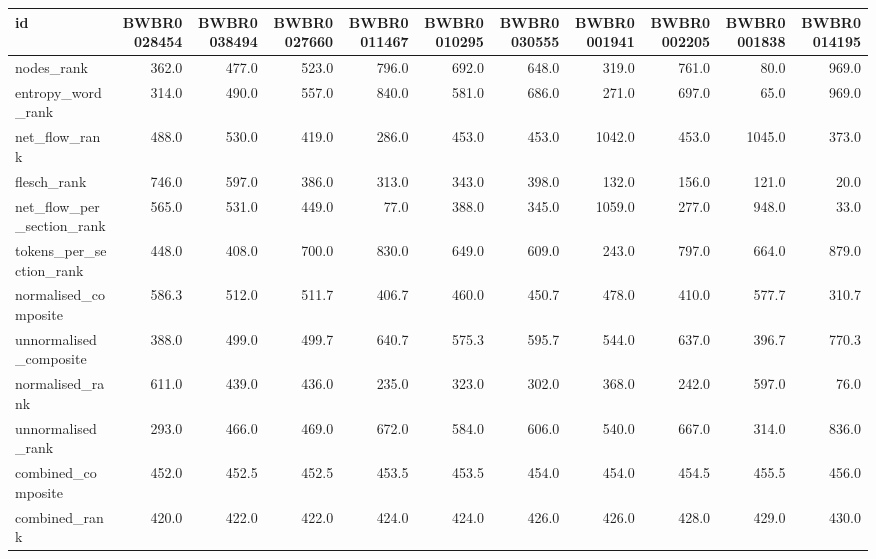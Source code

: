 \begin{tabular}{lrrrrrrrrrr}
\toprule
id & BWBR0028454 & BWBR0038494 & BWBR0027660 & BWBR0011467 & BWBR0010295 & BWBR0030555 & BWBR0001941 & BWBR0002205 & BWBR0001838 & BWBR0014195 \\
\midrule
nodes\_rank & 362.0 & 477.0 & 523.0 & 796.0 & 692.0 & 648.0 & 319.0 & 761.0 & 80.0 & 969.0 \\
\cline{1-11}
entropy\_word\_rank & 314.0 & 490.0 & 557.0 & 840.0 & 581.0 & 686.0 & 271.0 & 697.0 & 65.0 & 969.0 \\
\cline{1-11}
net\_flow\_rank & 488.0 & 530.0 & 419.0 & 286.0 & 453.0 & 453.0 & 1042.0 & 453.0 & 1045.0 & 373.0 \\
\cline{1-11}
flesch\_rank & 746.0 & 597.0 & 386.0 & 313.0 & 343.0 & 398.0 & 132.0 & 156.0 & 121.0 & 20.0 \\
\cline{1-11}
net\_flow\_per\_section\_rank & 565.0 & 531.0 & 449.0 & 77.0 & 388.0 & 345.0 & 1059.0 & 277.0 & 948.0 & 33.0 \\
\cline{1-11}
tokens\_per\_section\_rank & 448.0 & 408.0 & 700.0 & 830.0 & 649.0 & 609.0 & 243.0 & 797.0 & 664.0 & 879.0 \\
\cline{1-11}
normalised\_composite & 586.3 & 512.0 & 511.7 & 406.7 & 460.0 & 450.7 & 478.0 & 410.0 & 577.7 & 310.7 \\
\cline{1-11}
unnormalised\_composite & 388.0 & 499.0 & 499.7 & 640.7 & 575.3 & 595.7 & 544.0 & 637.0 & 396.7 & 770.3 \\
\cline{1-11}
normalised\_rank & 611.0 & 439.0 & 436.0 & 235.0 & 323.0 & 302.0 & 368.0 & 242.0 & 597.0 & 76.0 \\
\cline{1-11}
unnormalised\_rank & 293.0 & 466.0 & 469.0 & 672.0 & 584.0 & 606.0 & 540.0 & 667.0 & 314.0 & 836.0 \\
\cline{1-11}
combined\_composite & 452.0 & 452.5 & 452.5 & 453.5 & 453.5 & 454.0 & 454.0 & 454.5 & 455.5 & 456.0 \\
\cline{1-11}
combined\_rank & 420.0 & 422.0 & 422.0 & 424.0 & 424.0 & 426.0 & 426.0 & 428.0 & 429.0 & 430.0 \\
\cline{1-11}
\bottomrule
\end{tabular}
